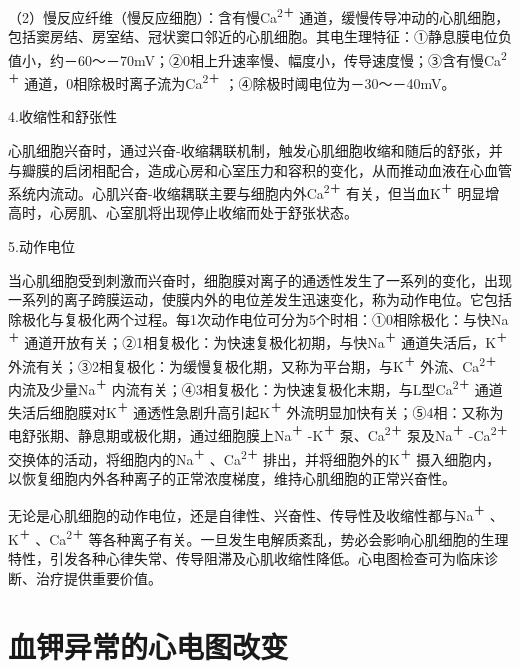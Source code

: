 （2）慢反应纤维（慢反应细胞）：含有慢Ca\textsuperscript{2＋}
通道，缓慢传导冲动的心肌细胞，包括窦房结、房室结、冠状窦口邻近的心肌细胞。其电生理特征：①静息膜电位负值小，约－60～－70mV；②0相上升速率慢、幅度小，传导速度慢；③含有慢Ca\textsuperscript{2＋}
通道，0相除极时离子流为Ca\textsuperscript{2＋}
；④除极时阈电位为－30～－40mV。

4.收缩性和舒张性

心肌细胞兴奋时，通过兴奋-收缩耦联机制，触发心肌细胞收缩和随后的舒张，并与瓣膜的启闭相配合，造成心房和心室压力和容积的变化，从而推动血液在心血管系统内流动。心肌兴奋-收缩耦联主要与细胞内外Ca\textsuperscript{2＋}
有关，但当血K\textsuperscript{＋}
明显增高时，心房肌、心室肌将出现停止收缩而处于舒张状态。

5.动作电位

当心肌细胞受到刺激而兴奋时，细胞膜对离子的通透性发生了一系列的变化，出现一系列的离子跨膜运动，使膜内外的电位差发生迅速变化，称为动作电位。它包括除极化与复极化两个过程。每1次动作电位可分为5个时相：①0相除极化：与快Na\textsuperscript{＋}
通道开放有关；②1相复极化：为快速复极化初期，与快Na\textsuperscript{＋}
通道失活后，K\textsuperscript{＋}
外流有关；③2相复极化：为缓慢复极化期，又称为平台期，与K\textsuperscript{＋}
外流、Ca\textsuperscript{2＋} 内流及少量Na\textsuperscript{＋}
内流有关；④3相复极化：为快速复极化末期，与L型Ca\textsuperscript{2＋}
通道失活后细胞膜对K\textsuperscript{＋}
通透性急剧升高引起K\textsuperscript{＋}
外流明显加快有关；⑤4相：又称为电舒张期、静息期或极化期，通过细胞膜上Na\textsuperscript{＋}
-K\textsuperscript{＋} 泵、Ca\textsuperscript{2＋}
泵及Na\textsuperscript{＋} -Ca\textsuperscript{2＋}
交换体的活动，将细胞内的Na\textsuperscript{＋} 、Ca\textsuperscript{2＋}
排出，并将细胞外的K\textsuperscript{＋}
摄入细胞内，以恢复细胞内外各种离子的正常浓度梯度，维持心肌细胞的正常兴奋性。

无论是心肌细胞的动作电位，还是自律性、兴奋性、传导性及收缩性都与Na\textsuperscript{＋}
、K\textsuperscript{＋} 、Ca\textsuperscript{2＋}
等各种离子有关。一旦发生电解质紊乱，势必会影响心肌细胞的生理特性，引发各种心律失常、传导阻滞及心肌收缩性降低。心电图检查可为临床诊断、治疗提供重要价值。

\protect\hypertarget{text00053.htmlux5cux23subid636}{}{}

\section{血钾异常的心电图改变}

\protect\hypertarget{text00053.htmlux5cux23subid637}{}{}

